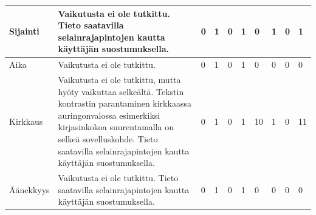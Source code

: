 \documentclass[finnish, 12pt, a4paper, elec, utf8, a-1b]{aaltothesis}
\begin{document}
{\begin{longtable}{p{2.5cm}|p{6cm}|p{0.5cm}p{0.5cm}p{0.5cm}|p{0.5cm}|p{0.5cm}p{0.5cm}p{0.5cm}|p{0.5cm}|}
    \midrule
    Sijainti                               & Vaikutusta ei ole tutkittu. Tieto saatavilla selainrajapintojen kautta käyttäjän suostumuksella.                                                                                                                                                              & 0                                          & 1                                   & 0                                      & 1                            & 0                                               & 1                                         & 0                                         & 1                            \\
    \midrule
    Aika                                   & Vaikutusta ei ole tutkittu.                                                                                                                                                                                                                                   & 0                                          & 1                                   & 0                                      & 1                            & 0                                               & 0                                         & 0                                         & 0                            \\
    \midrule
    Kirkkaus                               & Vaikutusta ei ole tutkittu, mutta hyöty vaikuttaa selkeältä. Tekstin kontrastin parantaminen kirkkaassa auringonvalossa esimerkiksi kirjasinkokoa suurentamalla on selkeä sovelluskohde. Tieto saatavilla selainrajapintojen kautta käyttäjän suostumuksella. & 0                                          & 1                                   & 0                                      & 1                            & 10                                              & 1                                         & 0                                         & 11                           \\
    \midrule
    Äänekkyys                              & Vaikutusta ei ole tutkittu. Tieto saatavilla selainrajapintojen kautta käyttäjän suostumuksella.                                                                                                                                                              & 0                                          & 1                                   & 0                                      & 1                            & 0                                               & 0                                         & 0                                         & 0                            \\

\end{longtable}}
\end{document}
